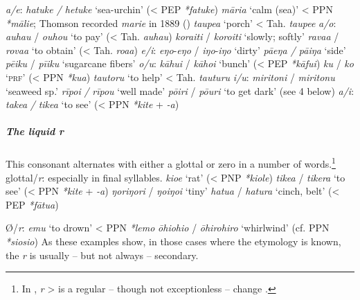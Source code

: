 \newpage 
\ea
\textit{a/e}: 
\ea
\textit{hatuke / hetuke} ‘sea-urchin’ ({\textless} PEP \textit{*fatuke})
\ex
\textit{māria} ‘calm (sea)’ {\textless} PPN \textit{*mālie}; Thomson recorded \textit{marie} in 1889 (\citealt[155]{Thomson1980})
\ex
\textit{taupe{\ꞌ}a} ‘porch’ {\textless} Tah. \textit{taupe{\ꞌ}e}
\z
\z
\ea
\textit{a/o}: 
\ea
\textit{{\ꞌ}auhau} / \textit{{\ꞌ}ouhou} ‘to pay’ ({\textless} Tah. \textit{{\ꞌ}auhau})
\ex
\textit{kora{\ꞌ}iti} / \textit{koro{\ꞌ}iti} ‘slowly; softly’
\ex
\textit{\mbox{rava{\ꞌ}a}} / \textit{rova{\ꞌ}a} ‘to obtain’ ({\textless} Tah. \textit{roa{\ꞌ}a})
\z
\z
\ea
\textit{e/i}: 
\ea
\textit{eŋo}{}-\textit{eŋo} / \textit{iŋo}{}-\textit{iŋo} ‘dirty’
\ex
\textit{pā{\ꞌ}eŋa / pā{\ꞌ}iŋa} ‘side’
\ex
\textit{pē{\ꞌ}iku} / \textit{pī{\ꞌ}iku} ‘sugarcane fibers’
\z
\z
\ea
\textit{o/u}: 
\ea
\textit{kāhui} / \textit{kāhoi} ‘bunch’ ({\textless} PEP \textit{*kāfui})
\ex
\textit{ku} / \textit{ko} ‘\textsc{prf}’ ({\textless} PPN \textit{*kua})
\ex
\textit{tautoru} ‘to help’ {\textless} Tah. \textit{tauturu}
\z
\z
\ea
\textit{i/u}: 
\ea
\textit{miritoni} / \textit{miritonu} ‘seaweed sp.’
\ex
\textit{rīpoi} \textit{/} \textit{rīpou} ‘well made’ 
\ex
\textit{pō{\ꞌ}iri} / \textit{pō{\ꞌ}uri} ‘to get dark’ (see 4 below)
\z
\z
\ea
\textit{a/i}: 
\ea
\textit{take{\ꞌ}a} \textit{/} \textit{tike{\ꞌ}a} ‘to see’ ({\textless} PPN \textit{*kite} + \textit{{}-{\ꞌ}a})
\z
\z
 
\subparagraph{The liquid \textit{r}} This consonant alternates with either a glottal or zero in a number of words.\footnote{\label{fn:63}In , \textit{r} > \textit{{\ꞌ}} is a regular – though not exceptionless – change \citep{Clark2000R}.} 
\ea
glottal/\textit{r}: especially in final syllables.
\ea
\textit{kio{\ꞌ}e} ‘rat’ ({\textless} PNP \textit{*kiole})
\ex
\textit{tike{\ꞌ}a} / \textit{tikera} ‘to see’ ({\textless} PPN \textit{*kite} + \textit{{}-{\ꞌ}a})
\ex
\textit{ŋoriŋori} / \textit{ŋo{\ꞌ}iŋo{\ꞌ}i} ‘tiny’
\ex
\textit{hatu{\ꞌ}a} / \textit{hatura} ‘cinch, belt’ ({\textless} PEP \textit{*fātu{\ꞌ}a})
\z
\z

\newpage 
\ea
Ø/\textit{r}: 
\ea
\textit{emu} ‘to drown’ {\textless} PPN \textit{*lemo}
\ex
\textit{{\ꞌ}ōhiohio} / \textit{{\ꞌ}ōhirohiro} ‘whirlwind’ (cf. PPN \textit{*siosio})
\z
\z
As these examples show, in those cases where the etymology is known, the \textit{r} is usually – but not always – secondary.

